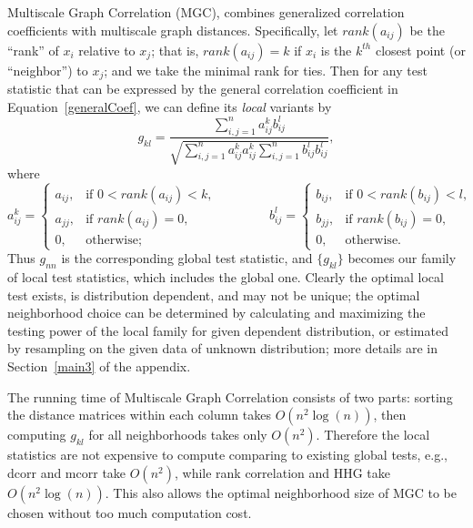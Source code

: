 \documentclass[11pt]{article}
\newcommand{\jv}[1]{{\color{red}{#1}}}
\begin{document}
Multiscale Graph Correlation (MGC), combines generalized correlation coefficients with multiscale graph distances.  Specifically, let $rank(a_{ij})$  be the ``rank'' of $x_i$ relative to $x_j$; that is, $rank(a_{ij})=k$ if $x_i$ is the $k^{th}$ closest point (or ``neighbor'') to $x_j$; and we take the minimal rank for ties.  Then for any test statistic that can be expressed by the general correlation coefficient in Equation~\ref{generalCoef}, we can define its \emph{local} variants by
\begin{equation}
\label{localCoef}
g_{kl}=\frac{\sum_{i,j=1}^n a_{ij}^k b_{ij}^l}{\sqrt{\sum_{i,j=1}^n  a_{ij}^{k} a_{ij}^{k} \sum_{i,j=1}^n b_{ij}^{l} b_{ij}^{l}}},
\end{equation}
where
\begin{equation}
    a_{ij}^k=
    \begin{cases}
      a_{ij}, & \text{if } 0 < rank(a_{ij}) < k, \\
			a_{jj}, & \text{if } rank(a_{ij}) =0, \\
      0, & \text{otherwise};
    \end{cases} \qquad \qquad
    b_{ij}^l=
    \begin{cases}
      b_{ij}, & \text{if } 0 < rank(b_{ij}) < l, \\
			b_{jj}, & \text{if } rank(b_{ij}) =0, \\
      0, & \text{otherwise}.
    \end{cases}
\end{equation}
\jv{i dont' see why we need the middle case?}
Thus $g_{nn}$ is the corresponding global test statistic, and $\{g_{kl}\}$ becomes our family of local test statistics, which includes the global one. Clearly the optimal local test exists, is distribution dependent, and may not be unique; the optimal neighborhood choice can be determined by calculating and maximizing the testing power of the local family for given dependent distribution, or estimated by resampling on the given data of unknown distribution; more details are in Section~\ref{main3} of the appendix.

The running time of Multiscale Graph Correlation consists of two parts: sorting the distance matrices within each column takes $O(n^2\log(n))$, then computing $g_{kl}$ for all neighborhoods takes only $O(n^2)$. Therefore the local statistics are not expensive to compute comparing to existing global tests, e.g., dcorr and mcorr take $O(n^2)$, while rank correlation and HHG take $O(n^2\log(n))$. This also allows the optimal neighborhood size of MGC to be chosen without too much computation cost.
\end{document}
